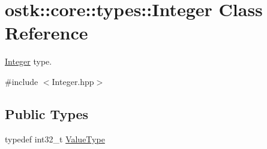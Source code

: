 \hypertarget{classostk_1_1core_1_1types_1_1_integer}{}\section{ostk\+:\+:core\+:\+:types\+:\+:Integer Class Reference}
\label{classostk_1_1core_1_1types_1_1_integer}


\hyperlink{classostk_1_1core_1_1types_1_1_integer}{Integer} type.  




{\ttfamily \#include $<$Integer.\+hpp$>$}

\subsection*{Public Types}
\begin{DoxyCompactItemize}
\item 
typedef int32\+\_\+t \hyperlink{classostk_1_1core_1_1types_1_1_integer_a76a5f41f78659f116eafaf26cecc3244}{Value\+Type}
\end{DoxyCompactItemize}

